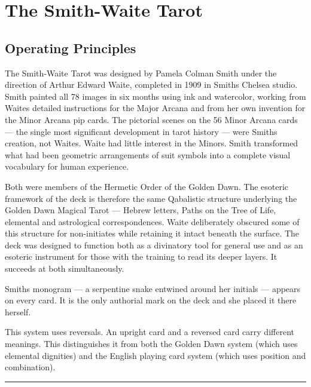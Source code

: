 \chapter{The Smith-Waite Tarot}\label{the-smith-waite-tarot}

\section{Operating Principles}\label{operating-principles}

The Smith-Waite Tarot was designed by Pamela Colman Smith under the direction of Arthur Edward Waite, completed in 1909 in Smith\textquotesingle s Chelsea studio. Smith painted all 78 images in six months using ink and watercolor, working from Waite\textquotesingle s detailed instructions for the Major Arcana and from her own invention for the Minor Arcana pip cards. The pictorial scenes on the 56 Minor Arcana cards --- the single most significant development in tarot history --- were Smith\textquotesingle s creation, not Waite\textquotesingle s. Waite had little interest in the Minors. Smith transformed what had been geometric arrangements of suit symbols into a complete visual vocabulary for human experience.

Both were members of the Hermetic Order of the Golden Dawn. The esoteric framework of the deck is therefore the same Qabalistic structure underlying the Golden Dawn Magical Tarot --- Hebrew letters, Paths on the Tree of Life, elemental and astrological correspondences. Waite deliberately obscured some of this structure for non-initiates while retaining it intact beneath the surface. The deck was designed to function both as a divinatory tool for general use and as an esoteric instrument for those with the training to read its deeper layers. It succeeds at both simultaneously.

Smith\textquotesingle s monogram --- a serpentine snake entwined around her initials --- appears on every card. It is the only authorial mark on the deck and she placed it there herself.

This system uses reversals. An upright card and a reversed card carry different meanings. This distinguishes it from both the Golden Dawn system (which uses elemental dignities) and the English playing card system (which uses position and combination).

\begin{center}\rule{0.5\linewidth}{0.5pt}\end{center}

